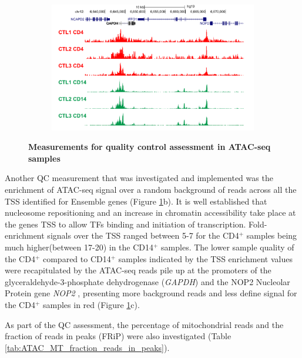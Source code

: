 \begin{figure}[htbp]
\begin{subfigure}[b]{0.6\textwidth}
\centering
\includegraphics[width=\textwidth]{./Results1/pdfs/ATAC_Core_CD4_CD14_fresh_GAPDH}
\caption{\textbf{}} %
\end{subfigure}
\caption[Measurements for quality control assessment in ATAC-seq samples]{\textbf{Measurements for quality control assessment in ATAC-seq samples}}
\label{fig:QC_ATAC}
\end{figure} 



Another QC measurement that was investigated and implemented was the enrichment of ATAC-seq signal over a random background of reads across all the TSS identified for Ensemble genes (Figure \ref{fig:QC_ATAC}b). It is well established that nucleosome repositioning and an increase in chromatin accessibility take place at the genes TSS to allow TFs binding and initiation of transcription. Fold-enrichment signals over the TSS ranged between 5-7 for the CD4$^+$ samples being much higher(between 17-20) in the CD14$^+$ samples. The lower sample quality of the CD4$^+$ compared to CD14$^+$ samples indicated by the TSS enrichment values were recapitulated by the ATAC-seq reads pile up at the promoters of the glyceraldehyde-3-phosphate dehydrogenase (\textit{GAPDH}) and the NOP2 Nucleolar Protein gene \textit{NOP2} , presenting more background reads and less define signal for the CD4$^+$ samples in red (Figure \ref{fig:QC_ATAC}c).
	
As part of the QC assessment, the percentage of mitochondrial reads and the fraction of reads in peaks (FRiP) were also investigated (Table \ref{tab:ATAC_MT_fraction_reads_in_peaks}). 

